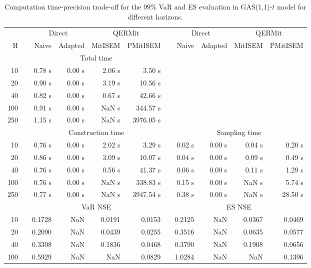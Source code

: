 { \renewcommand{\arraystretch}{1.3} 
\begin{table}[h] 
\centering 
\caption{Computation time-precision trade-off for the  $99\%$ VaR and ES evaluation in GAS(1,1)-$t$ model for different horizons.} 
\label{tab:time_precision_t_gas_ML} 
\begin{tabular}{rr rrrr r rrrr}  
 & & \multicolumn{2}{c}{Direct} & \multicolumn{2}{c}{QERMit}&  & \multicolumn{2}{c}{Direct} & \multicolumn{2}{c}{QERMit} \\ \cline{3-6} \cline{8-11} 
 H & & Naive & Adapted & MitISEM & PMitISEM & & Naive & Adapted & MitISEM & PMitISEM \\ \hline 
 & & \multicolumn{4}{c}{Total time}  \\ \cline{3-6} 
10 & & 0.78 s & 0.00 s & 2.06 s & 3.50 s \\ 
20 & & 0.90 s & 0.00 s & 3.19 s & 10.56 s \\ 
40 & & 0.82 s & 0.00 s & 0.67 s & 42.66 s \\ 
100 & & 0.91 s & 0.00 s &  NaN s & 344.57 s \\ 
250 & & 1.15 s & 0.00 s &  NaN s & 3976.05 s \\ 
\hline 
 & & \multicolumn{4}{c}{Construction time} & & \multicolumn{4}{c}{ Sampling time} \\ \cline{3-6}  \cline{8-11}
10 & & 0.76 s & 0.00 s & 2.02 s & 3.29 s && 0.02 s & 0.00 s & 0.04 s & 0.20 s \\ 
20 & & 0.86 s & 0.00 s & 3.09 s & 10.07 s && 0.04 s & 0.00 s & 0.09 s & 0.49 s \\ 
40 & & 0.76 s & 0.00 s & 0.56 s & 41.37 s && 0.06 s & 0.00 s & 0.11 s & 1.29 s \\ 
100 & & 0.76 s & 0.00 s &  NaN s & 338.83 s && 0.15 s & 0.00 s &  NaN s & 5.74 s \\ 
250 & & 0.77 s & 0.00 s &  NaN s & 3947.54 s && 0.38 s & 0.00 s &  NaN s & 28.50 s \\ 
\hline 
 & & \multicolumn{4}{c}{VaR NSE} &&  \multicolumn{4}{c}{ES NSE} \\ \cline{3-6}  \cline{8-11}
10 && 0.1728  &    NaN  & 0.0191 & 0.0153 && 0.2125  &    NaN  & 0.0367 & 0.0469 \\ 
20 && 0.2090  &    NaN  & 0.0439 & 0.0255 && 0.3516  &    NaN  & 0.0635 & 0.0577 \\ 
40 && 0.3308  &    NaN  & 0.1836 & 0.0468 && 0.3790  &    NaN  & 0.1908 & 0.0656 \\ 
100 && 0.5929  &    NaN  &    NaN & 0.0829 && 1.0284  &    NaN  &    NaN & 0.1396 \\ 

\end{tabular}
\end{table}}
